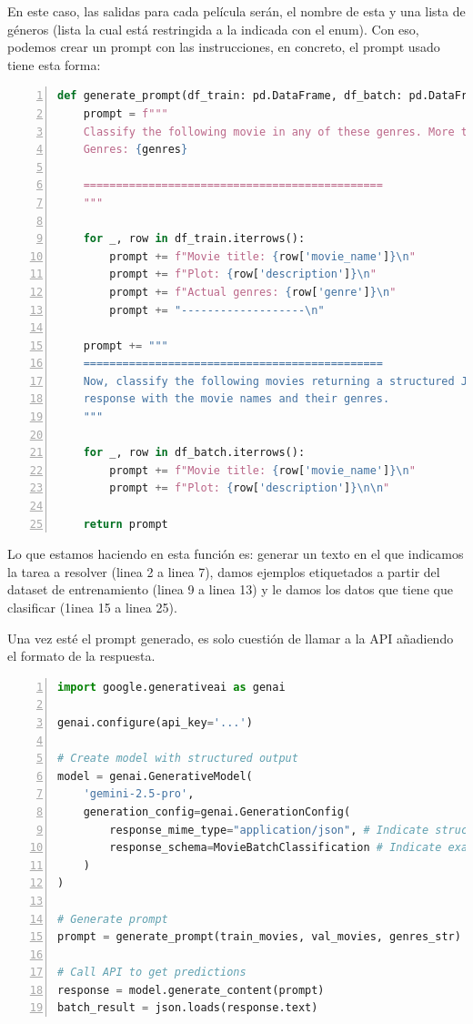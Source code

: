 \documentclass[11pt,spanish,listoffigures,listoftables]{tfgetsinf}
\begin{document}
En este caso, las salidas para cada película serán, el nombre de esta y una lista de géneros (lista la cual está restringida a la indicada con el enum). Con eso, podemos crear un prompt con las instrucciones, en concreto, el prompt usado tiene esta forma:

\begin{lstlisting}[language=Python, basicstyle=\ttfamily\small, frame=single, numbers=left, breaklines=true]
def generate_prompt(df_train: pd.DataFrame, df_batch: pd.DataFrame, genres: str) -> str:
    prompt = f"""
    Classify the following movie in any of these genres. More than one genre can be assigned.
    Genres: {genres}

    ==============================================
    """

    for _, row in df_train.iterrows():
        prompt += f"Movie title: {row['movie_name']}\n"
        prompt += f"Plot: {row['description']}\n"
        prompt += f"Actual genres: {row['genre']}\n"
        prompt += "-------------------\n"

    prompt += """
    ==============================================
    Now, classify the following movies returning a structured JSON
    response with the movie names and their genres.
    """

    for _, row in df_batch.iterrows():
        prompt += f"Movie title: {row['movie_name']}\n"
        prompt += f"Plot: {row['description']}\n\n"

    return prompt
\end{lstlisting}

Lo que estamos haciendo en esta función es: generar un texto en el que indicamos la tarea a resolver (linea 2 a linea 7), damos ejemplos etiquetados a partir del dataset de entrenamiento (linea 9 a linea 13) y le damos los datos que tiene que clasificar (1inea 15 a linea 25). 

Una vez esté el prompt generado, es solo cuestión de llamar a la API añadiendo el formato de la respuesta.
\begin{lstlisting}[language=Python, basicstyle=\ttfamily\small, frame=single, numbers=left, breaklines=true]
import google.generativeai as genai

genai.configure(api_key='...')

# Create model with structured output
model = genai.GenerativeModel(
    'gemini-2.5-pro',
    generation_config=genai.GenerationConfig(
        response_mime_type="application/json", # Indicate structured output
        response_schema=MovieBatchClassification # Indicate exact output format 
    )
)

# Generate prompt
prompt = generate_prompt(train_movies, val_movies, genres_str)

# Call API to get predictions
response = model.generate_content(prompt)
batch_result = json.loads(response.text)
\end{lstlisting}
\end{document}
